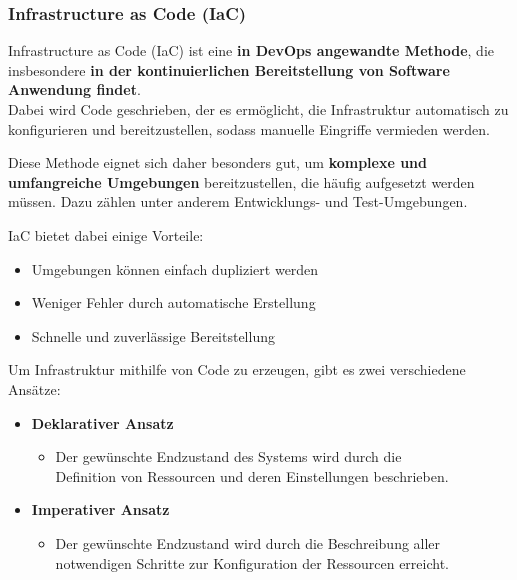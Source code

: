 
    \subsubsection{Infrastructure as Code (IaC)} \label{IaC}

    Infrastructure as Code (IaC) ist eine \textbf{in DevOps angewandte Methode}, die insbesondere \textbf{in der kontinuierlichen Bereitstellung von Software Anwendung findet}. \\
    Dabei wird Code geschrieben, der es ermöglicht, die Infrastruktur automatisch zu konfigurieren und bereitzustellen, 
    sodass manuelle Eingriffe vermieden werden. \\
    \cite{EA:Web37}

    Diese Methode eignet sich daher besonders gut, um \textbf{komplexe und umfangreiche Umgebungen} bereitzustellen, die häufig aufgesetzt werden müssen. Dazu zählen unter anderem Entwicklungs- und Test-Umgebungen. \\
    \cite{EA:Web30, EA:Web39}
    
    IaC bietet dabei einige Vorteile:
    \begin{itemize}
        \item Umgebungen können einfach dupliziert werden
        \item Weniger Fehler durch automatische Erstellung
        \item Schnelle und zuverlässige Bereitstellung
    \end{itemize}

    Um Infrastruktur mithilfe von Code zu erzeugen, gibt es zwei verschiedene Ansätze:
    \begin{itemize}
        \item \textbf{Deklarativer Ansatz}
        \begin{itemize}[label=$\circ$]
            \item Der gewünschte Endzustand des Systems wird durch die \\ Definition von Ressourcen und deren Einstellungen beschrieben.
        \end{itemize}
        
        \item \textbf{Imperativer Ansatz}
        \begin{itemize}[label=$\circ$]
            \item Der gewünschte Endzustand wird durch die Beschreibung aller \\ notwendigen Schritte zur Konfiguration der Ressourcen erreicht.
        \end{itemize}
    \end{itemize}

